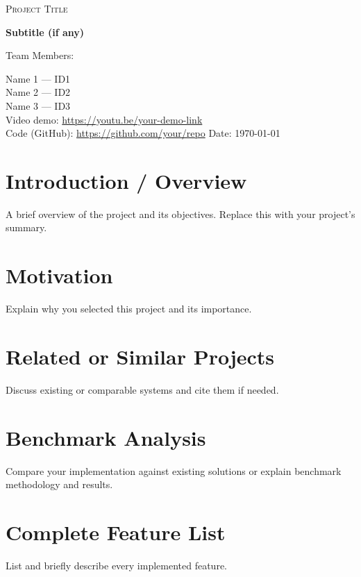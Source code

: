 \documentclass[12pt,a4paper]{report}
\begin{document}
\begin{titlepage}
  \centering
  {\scshape\LARGE Project Title \par}
  \vspace{1.5cm}
  {\huge\bfseries Subtitle (if any)\par}
  \vspace{1.5cm}
  {\Large Team Members:\par}
  \vspace{0.5cm}
  {Name 1 --- ID1\\
   Name 2 --- ID2\\
   Name 3 --- ID3\\}
  \vfill
  Video demo: \href{https://youtu.be/your-demo-link}{https://youtu.be/your-demo-link}\\
  Code (GitHub): \href{https://github.com/your/repo}{https://github.com/your/repo}
  \vfill
  {\large Date: \today}\
\end{titlepage}

\tableofcontents
\listoffigures
\listoftables
\clearpage

\chapter{Introduction / Overview}
A brief overview of the project and its objectives. Replace this with your project's summary.

\chapter{Motivation}
Explain why you selected this project and its importance.

\chapter{Related or Similar Projects}
Discuss existing or comparable systems and cite them if needed.

\chapter{Benchmark Analysis}
Compare your implementation against existing solutions or explain benchmark methodology and results.

\chapter{Complete Feature List}
List and briefly describe every implemented feature.
\end{document}
